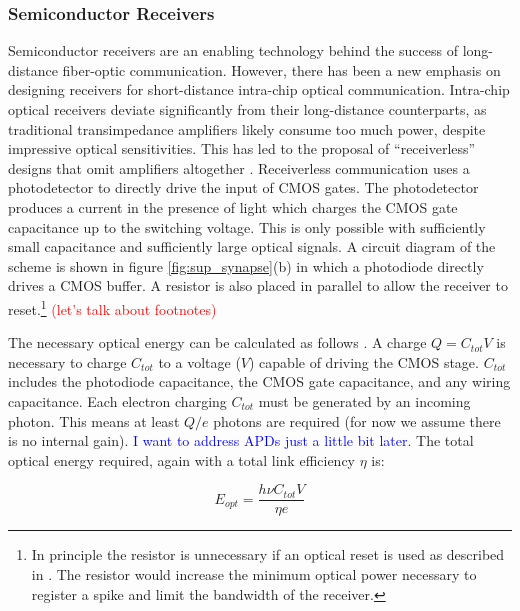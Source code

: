 \documentclass[twocolumn]{article}
\begin{document}
\subsubsection{Semiconductor Receivers}
\quad \quad Semiconductor receivers are an enabling technology behind the success of long-distance fiber-optic communication. However, there has been a new emphasis on designing receivers for short-distance intra-chip optical communication. Intra-chip optical receivers deviate significantly from their long-distance counterparts, as traditional transimpedance amplifiers likely consume too much power, despite impressive optical sensitivities. This has led to the proposal of ``receiverless'' designs that omit amplifiers altogether \cite{miller2017attojoule}. Receiverless communication uses a photodetector to directly drive the input of CMOS gates. The photodetector produces a current in the presence of light which charges the CMOS gate capacitance up to the switching voltage. This is only possible with sufficiently small capacitance and sufficiently large optical signals. A circuit diagram of the scheme is shown in figure \ref{fig:sup_synapse}(b) in which a photodiode directly drives a CMOS buffer. A resistor is also placed in parallel to allow the receiver to reset.\footnote{In principle the resistor is unnecessary if an optical reset is used as described in \cite{debaes2003receiver}. The resistor would increase the minimum optical power necessary to register a spike and limit the bandwidth of the receiver.} \textcolor{red}{(let's talk about footnotes)}

The necessary optical energy can be calculated as follows \cite{miller2017attojoule}. A charge $Q = C_{tot}V$ is necessary to charge $C_{tot}$ to a voltage ($V$) capable of driving the CMOS stage. $C_{tot}$ includes the photodiode capacitance, the CMOS gate capacitance, and any wiring capacitance. Each electron charging $C_{tot}$ must be generated by an incoming photon. This means at least $Q/e$ photons are required (for now we assume there is no internal gain). \textcolor{blue}{I want to address APDs just a little bit later.} The total optical energy required, again with a total link efficiency $\eta$ is:

\begin{equation}
    E_{opt} = \frac{h \nu C_{tot} V}{\eta e}
\end{equation}
\end{document}

